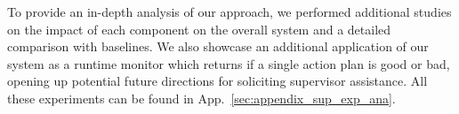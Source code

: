  To provide an in-depth analysis of our approach, we performed additional studies on the impact of each component on the overall system and a detailed comparison with baselines. 
We also showcase an additional application of our system as a runtime monitor which returns if a single action plan is good or bad, opening up potential future directions for soliciting supervisor assistance. 
All these experiments can be found in App.~\ref{sec:appendix_sup_exp_ana}.










































       

       
   
       









    

    








    



    








    

    


